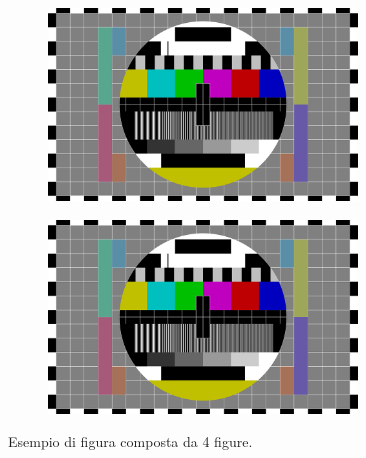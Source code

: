 \begin{figure}[!ht]
	\begin{subfigure}{0.49\textwidth}
		\includegraphics[width=0.9\textwidth]{images/cap2/test} 
		\caption{}
	\end{subfigure}
	\begin{subfigure}{0.49\textwidth}
		\includegraphics[width=0.9\textwidth]{images/cap2/test}
		\caption{}
	\end{subfigure}
    \caption{Esempio di figura composta da 4 figure.}
\end{figure}